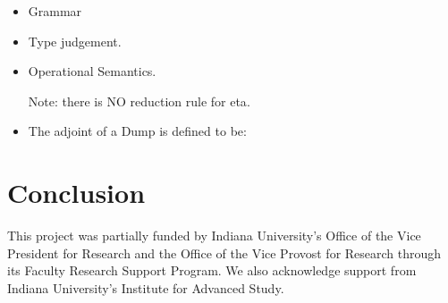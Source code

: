 \documentclass[preprint]{sigplanconf}
\begin{document}
\begin{itemize}
\item Grammar

\item
Type judgement.


\item
Operational Semantics.

Note: there is NO reduction rule for {{eta}}. 

\item
The adjoint of a Dump is defined to be:

\end{itemize}

\section{Conclusion}

\acks This project was partially funded by Indiana University's Office of the
Vice President for Research and the Office of the Vice Provost for Research
through its Faculty Research Support Program.  We also acknowledge support
from Indiana University's Institute for Advanced Study.

\begin{small}


\end{small}
\end{document}
